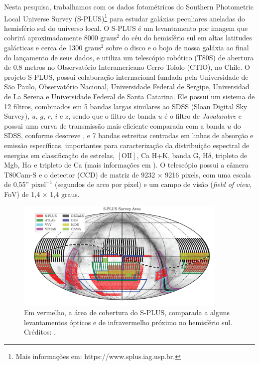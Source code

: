 Nesta pesquisa, trabalhamos com os dados fotométricos do Southern Photometric Local Universe Survey (S-PLUS)\footnote{Mais informações em: https://www.splus.iag.usp.br.} para estudar galáxias peculiares aneladas do hemisfério sul do universo local. O S-PLUS é um levantamento por imagem que cobrirá aproximadamente 8000 $\mathrm{graus}^{2}$ do céu do hemisfério sul em altas latitudes galácticas e cerca de 1300 $\mathrm{graus}^{2}$ sobre o disco e o bojo de nossa galáxia ao final do lançamento de seus dados, e utiliza um telescópio robótico (T80S) de abertura de 0,8 metros no Observatório Interamericano Cerro Tololo (CTIO), no Chile. O projeto S-PLUS, possui colaboração internacional fundada pela Universidade de São Paulo, Observatório Nacional,
Universidade Federal de Sergipe, Universidad de La Serena e Universidade Federal de Santa Catarina. Ele possui um sistema de 12 filtros, combinados em 5 bandas largas similares ao SDSS (Sloan Digital Sky Survey), $u$, $g$, $r$, $i$ e $z$, sendo que o filtro de banda $u$ é o filtro de \emph{Javalambre} e possui uma curva de transmissão mais eficiente comparada com a banda $u$ do SDSS, conforme descreve , e 7 bandas estreitas centradas em linhas de absorção e emissão específicas, importantes para caracterização da distribuição espectral de energias em classificação de estrelas, $[\text{OII}]$, Ca H+K, banda G, H$\delta$, tripleto de Mgb, H$\alpha$ e tripleto de Ca (mais informações em ). O telescópio possui a câmera T80Cam-S e o detector (CCD) de matriz de 9232 × 9216 pixels, com uma escala de 0,55'' $\mathrm{pixel}^{-1}$ (segundos de arco por pixel) e um campo de visão (\emph{field of view}, FoV) de 1,4 × 1,4 graus.

\begin{figure}[h]
  \centering 
  \includegraphics[width=0.9\textwidth]{Imagens/surveyarea.PNG} 
  \caption[Área de cobertura do S-PLUS.]{Em vermelho, a área de cobertura do S-PLUS, comparada a alguns levantamentos ópticos e de infravermelho próximo no hemisfério sul. Créditos: .}
  \label{fig:surveyarea} 
\end{figure}

